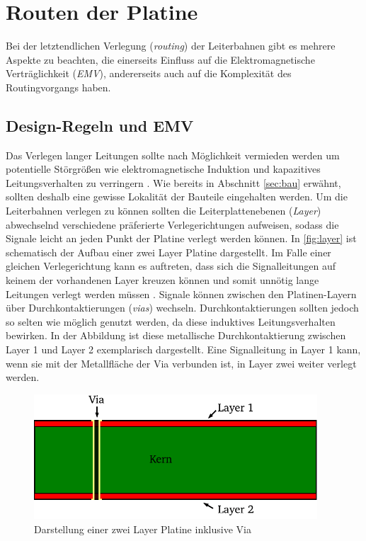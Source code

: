 \section{Routen der Platine}
Bei der letztendlichen Verlegung (\textit{routing}) der Leiterbahnen gibt es mehrere Aspekte zu beachten, die einerseits Einfluss auf die Elektromagnetische Verträglichkeit (\textit{EMV}), andererseits auch auf die Komplexität des Routingvorgangs haben.
\subsection{Design-Regeln und EMV}\label{sec:design}
Das Verlegen langer Leitungen sollte nach Möglichkeit vermieden werden um potentielle Störgrößen wie elektromagnetische Induktion und kapazitives Leitungsverhalten zu verringern \cite{haendschke}. Wie bereits in Abschnitt \autoref{sec:bau} erwähnt, sollten deshalb eine gewisse Lokalität der Bauteile eingehalten werden. Um die Leiterbahnen verlegen zu können sollten die Leiterplattenebenen (\textit{Layer}) abwechselnd verschiedene präferierte Verlegerichtungen aufweisen, sodass die Signale leicht an jeden Punkt der Platine verlegt werden können. In \autoref{fig:layer} ist schematisch der Aufbau einer zwei Layer Platine dargestellt. Im Falle einer gleichen Verlegerichtung kann es auftreten, dass sich die Signalleitungen auf keinem der vorhandenen Layer kreuzen können und somit unnötig lange Leitungen verlegt werden müssen \cite{haendschke}. Signale können zwischen den Platinen-Layern über Durchkontaktierungen (\textit{vias}) wechseln. Durchkontaktierungen sollten jedoch so selten wie möglich genutzt werden, da diese induktives Leitungsverhalten bewirken. In der Abbildung ist diese metallische Durchkontaktierung zwischen Layer 1 und Layer 2 exemplarisch dargestellt. Eine Signalleitung in Layer 1 kann, wenn sie mit der Metallfläche der Via verbunden ist, in Layer zwei weiter verlegt werden.
\begin{figure}[H]%
\centering
\includegraphics[width=300pt]{./Bilder/layer}%
\caption{Darstellung einer zwei Layer Platine inklusive Via}%
\label{fig:layer}%
\end{figure}\noindent
